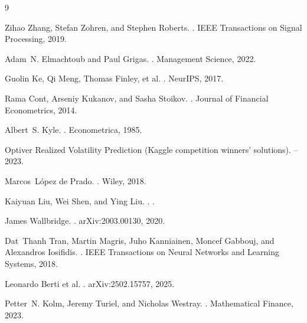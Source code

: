 \documentclass[11pt]{article}
\begin{document}

\begin{thebibliography}{9}

Zihao Zhang, Stefan Zohren, and Stephen Roberts.
.
\newblock IEEE Transactions on Signal Processing, 2019.

Adam~N. Elmachtoub and Paul Grigas.
.
\newblock Management Science, 2022.

Guolin Ke, Qi Meng, Thomas Finley, et al.
.
\newblock NeurIPS, 2017.

Rama Cont, Arseniy Kukanov, and Sasha Stoikov.
.
\newblock Journal of Financial Econometrics, 2014.

Albert~S. Kyle.
.
\newblock Econometrica, 1985.

Optiver Realized Volatility Prediction (Kaggle competition winners' solutions).
--2023.

Marcos~L\'opez de Prado.
.
\newblock Wiley, 2018.

Kaiyuan Liu, Wei Shen, and Ying Liu.
.
.

James Wallbridge.
.
\newblock arXiv:2003.00130, 2020.

Dat~Thanh Tran, Martin Magris, Juho Kanniainen, Moncef Gabbouj, and Alexandros Iosifidis.
.
\newblock IEEE Transactions on Neural Networks and Learning Systems, 2018.

Leonardo Berti et al.
.
\newblock arXiv:2502.15757, 2025.

Petter~N. Kolm, Jeremy Turiel, and Nicholas Westray.
.
\newblock Mathematical Finance, 2023.


\end{thebibliography}
\end{document}
